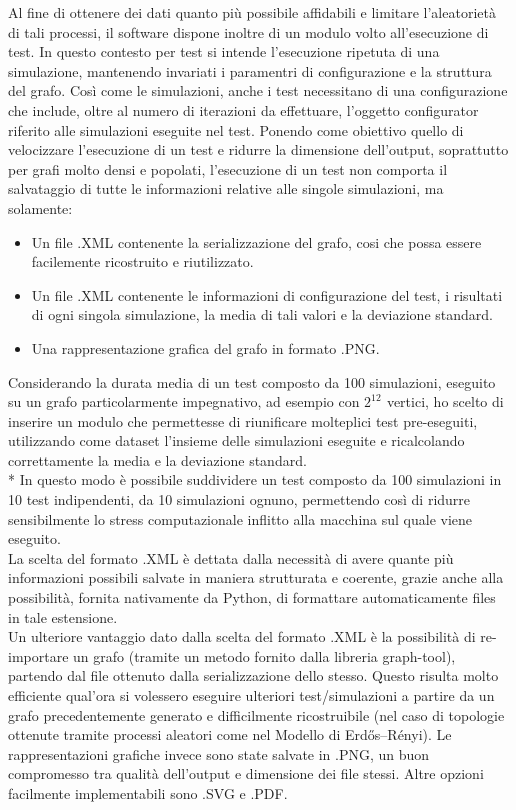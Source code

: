 \documentclass{article}
\begin{document}
Al fine di ottenere dei dati quanto più possibile affidabili e limitare l'aleatorietà di tali processi, il software dispone inoltre di un modulo volto all'esecuzione di test. In questo contesto per test si intende l'esecuzione ripetuta di una simulazione, mantenendo invariati i paramentri di configurazione e la struttura del grafo. Così come le simulazioni, anche i test necessitano di una configurazione che include, oltre al numero di iterazioni da effettuare, l'oggetto configurator riferito alle simulazioni eseguite nel test.
Ponendo come obiettivo quello di velocizzare l'esecuzione di un test e ridurre la dimensione dell'output, soprattutto per grafi molto densi e popolati, l'esecuzione di un test non comporta il salvataggio di tutte le informazioni relative alle singole simulazioni, ma solamente:
\begin{itemize}
\item Un file .XML contenente la serializzazione del grafo, cosi che possa essere facilemente ricostruito e riutilizzato.
\item Un file .XML contenente le informazioni di configurazione del test, i risultati di ogni singola simulazione, la media di tali valori e la deviazione standard.
\item Una rappresentazione grafica del grafo in formato .PNG.
\end{itemize}
Considerando la durata media di un test composto da 100 simulazioni, eseguito su un grafo particolarmente impegnativo, ad esempio con $2^{12^{\mathrm{}}}$ vertici, ho scelto di inserire un modulo che permettesse di riunificare molteplici test pre-eseguiti, utilizzando come dataset l'insieme delle simulazioni eseguite e ricalcolando correttamente la media e la deviazione standard.\\*
In questo modo è possibile suddividere un test composto da 100 simulazioni in 10 test indipendenti, da 10 simulazioni ognuno, permettendo così di ridurre sensibilmente lo stress computazionale inflitto alla macchina sul quale viene eseguito.\\
La scelta del formato .XML è dettata dalla necessità di avere quante più informazioni possibili salvate in maniera strutturata e coerente, grazie anche alla possibilità, fornita nativamente da Python, di formattare automaticamente files in tale estensione.\\
Un ulteriore vantaggio dato dalla scelta del formato .XML è la possibilità di re-importare un grafo (tramite un metodo fornito dalla libreria graph-tool), partendo dal file ottenuto dalla serializzazione dello stesso. Questo risulta molto efficiente qual'ora si volessero eseguire ulteriori test/simulazioni a partire da un grafo precedentemente generato e difficilmente ricostruibile (nel caso di topologie ottenute tramite processi aleatori come nel Modello di Erdős–Rényi).
Le rappresentazioni grafiche invece sono state salvate in .PNG, un buon compromesso tra qualità dell'output e dimensione dei file stessi. Altre opzioni facilmente implementabili sono .SVG e .PDF.
\end{document}

